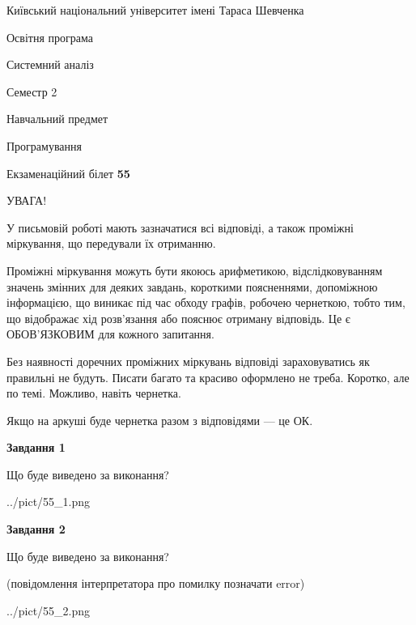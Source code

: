 \documentclass[12pt, ukrainian]{article}
\begin{document}
{{\begin {small}\par
{ \center  Київський національний університет імені Тараса Шевченка \par}
{\parbox {5 cm}{Освітня програма \hfill}{\parbox {7 cm}{Системний аналіз \hfill}}\parbox {6 cm}{\hfill Семестр 2}}\par
{\parbox {5 cm} {Навчальний предмет \hfill}\parbox {7 cm}{Програмування \hfill}\parbox {6cm}{\hfill}\par}\vspace{-7pt} \end{small}}{\center Екзаменаційний білет \No \textbf
{ 55 }\par}}
{
\begin {large}
УВАГА!

У письмовій роботі мають зазначатися всі відповіді, а також проміжні міркування, що передували їх отриманню.

Проміжні міркування можуть бути якоюсь арифметикою, відслідковуванням зна\-чень змінних для деяких завдань,
короткими поясненнями, допоміжною інформацією, що виникає під час обходу графів, робочею чернеткою,
тобто тим, що відображає хід розв’язання або пояснює отриману відповідь.
Це є ОБОВ’ЯЗКОВИМ для кожного запитання.

Без наявності доречних проміжних міркувань відповіді зараховуватись як правиль\-ні не будуть.
Писати багато та красиво оформлено не треба. Коротко, але по темі. Можли\-во, навіть чернетка.

Якщо на аркуші буде чернетка разом з відповідями --- це ОК.

\newpage

{\begin {center}\textbf{Завдання 1}\end {center}}\par
Що буде виведено за виконання?\par
\begin{center}
	{../pict/55_1.png}
\end{center}
\newpage

{\begin {center}\textbf{Завдання 2}\end {center}}\par
Що буде виведено за виконання?\par
 (повідомлення інтерпретатора про помилку позначати error)\par
\begin{center}
	{../pict/55_2.png}
\end{center}
\newpage


\end{large}}
\end{document}
